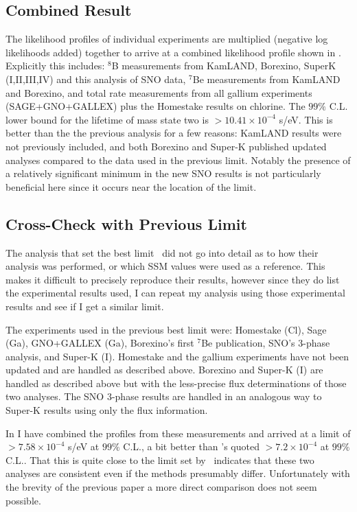 \subsection{Combined Result}
\label{sec:combobreaker}

The likelihood profiles of individual experiments are multiplied (negative log likelihoods added) together to arrive at a combined likelihood profile shown in . 
Explicitly this includes: $^8$B measurements from KamLAND, Borexino, SuperK (I,II,III,IV) and this analysis of SNO data, $^7$Be measurements from KamLAND and Borexino, and total rate measurements from all gallium experiments (SAGE+GNO+GALLEX) plus the Homestake results on chlorine. 
The $99\%$ C.L. lower bound for the lifetime of mass state two is $>10.41\times10^{-4}$ s/eV. 
This is better than the the previous analysis for a few reasons: KamLAND results were not previously included, and both Borexino and Super-K published updated analyses compared to the data used in the previous limit. 
Notably the presence of a relatively significant minimum in the new SNO results is not particularly beneficial here since it occurs near the location of the limit.

\subsection{Cross-Check with Previous Limit}

The analysis that set the best limit~\cite{picoreti} did not go into detail as to how their analysis was performed, or which SSM values were used as a reference.
This makes it difficult to precisely reproduce their results, however since they do list the experimental results used, I can repeat my analysis using those experimental results and see if I get a similar limit.

The experiments used in the previous best limit were: Homestake (Cl), Sage (Ga), GNO+GALLEX (Ga), Borexino's first $^7$Be publication, SNO's 3-phase analysis, and Super-K (I). 
Homestake and the gallium experiments have not been updated and are handled as described above.
Borexino and Super-K (I) are handled as described above but with the less-precise flux determinations of those two analyses. 
The SNO 3-phase results are handled in an analogous way to Super-K results using only the flux information.


In  I have combined the profiles from these measurements and arrived at a limit of $>7.58\times10^{-4}$ s/eV at $99\%$ C.L., a bit better than \cite{picoreti}'s quoted $>7.2\times10^{-4}$ at $99\%$ C.L..
That this is quite close to the limit set by~\cite{picoreti} indicates that these two analyses are consistent even if the methods presumably differ.
Unfortunately with the brevity of the previous paper a more direct comparison does not seem possible.

